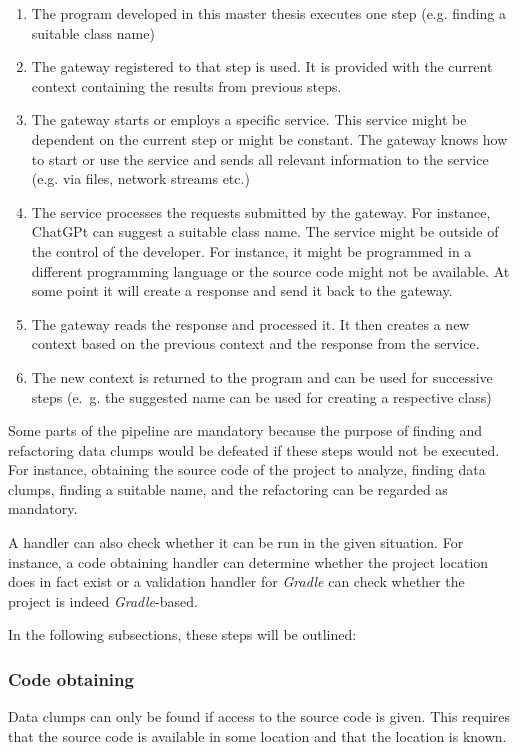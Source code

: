 \begin{enumerate}
    \item The program developed in this master thesis executes one step (e.g. finding a suitable class name)
    \item The gateway registered to that step is used. It is provided with the current context containing the results from previous steps.
    \item The gateway starts or employs a specific service. This service might be dependent on the current step or might be constant. The gateway knows how to start or use the service and sends all relevant information to the service (e.g. via files, network streams etc.) 
    \item The service processes the requests submitted by the gateway. For instance, ChatGPt can suggest a suitable class name. The service might be outside of the control of the developer. For instance, it might be programmed in a different programming language or the source code might not be available. At some point it will create a response and send it back to the gateway. 
    \item The gateway reads the response and processed it. It then creates a new context based on the previous context and the response from the service. 
    \item The new context is returned to the program and can be used for successive steps (e.~g. the suggested name can be used for creating a respective class) 
\end{enumerate}

Some parts of the pipeline are mandatory because the purpose of finding and refactoring data clumps would be defeated if these steps would not be executed. For instance, obtaining the source code of the project to analyze, finding data clumps, finding a suitable name, and the refactoring can be regarded as mandatory.

A handler can also check whether it can be run in the given situation. For instance, a code obtaining handler can determine whether the project location does in fact exist or a validation handler for \textit{Gradle} can check whether the project is indeed \textit{Gradle}-based.

In the following subsections, these steps will be outlined:
\subsubsection{Code obtaining}\label{sec:code_obtaining}
Data clumps can only be found if access to the source code is given. This requires that the source code is available in some location and that the location is known.

